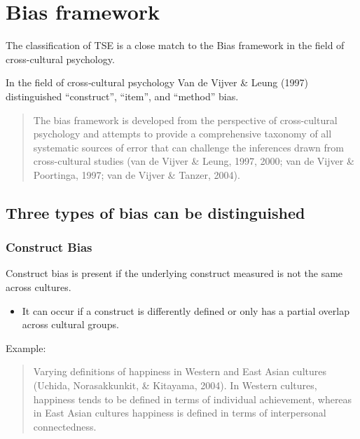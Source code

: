 \documentclass[
]{book}
\providecommand{\tightlist}{%
  \setlength{\itemsep}{0pt}\setlength{\parskip}{0pt}}
\begin{document}
\hypertarget{bias-framework}{%
\section{Bias framework}\label{bias-framework}}

The classification of TSE is a close match to the Bias framework in the field of cross-cultural psychology.

In the field of cross‐cultural psychology Van de Vijver \& Leung (1997) distinguished ``construct'', ``item'', and ``method'' bias.

\begin{quote}
The bias framework is developed from the perspective of cross-cultural psychology and attempts to provide a comprehensive taxonomy of all systematic sources of error that can challenge the inferences drawn from cross-cultural studies (van de Vijver \& Leung, 1997, 2000; van de Vijver \& Poortinga, 1997; van de Vijver \& Tanzer, 2004).
\end{quote}

\hypertarget{three-types-of-bias-can-be-distinguished}{%
\subsection{Three types of bias can be distinguished}\label{three-types-of-bias-can-be-distinguished}}

\hypertarget{construct-bias}{%
\subsubsection{Construct Bias}\label{construct-bias}}

Construct bias is present if the underlying construct measured is not the same across cultures.

\begin{itemize}
\tightlist
\item
  It can occur if a construct is differently defined or only has a partial overlap across cultural groups.
\end{itemize}

Example:

\begin{quote}
Varying definitions of happiness in Western and East Asian cultures (Uchida, Norasakkunkit, \& Kitayama, 2004). In Western cultures, happiness tends to be defined in terms of individual achievement, whereas in East Asian cultures happiness is defined in terms of interpersonal connectedness.
\end{quote}
\end{document}
